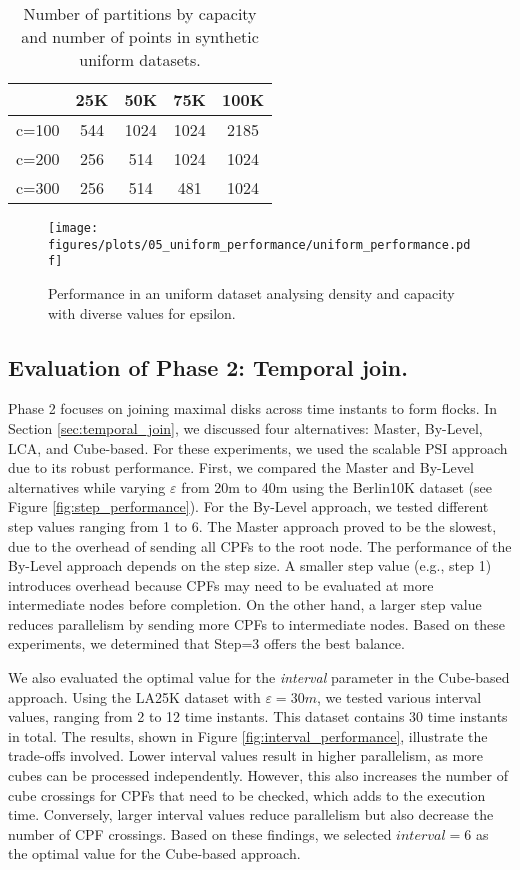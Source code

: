 \begin{table}
    \centering
    \caption{Number of partitions by capacity and number of points in synthetic uniform datasets.}
    \label{tab:uniform_ncells}
    \begin{tabular}{c|cccc}
              & 25K & 50K  & 75K  & 100K \\
        \hline
        c=100 & 544 & 1024 & 1024 & 2185 \\
        c=200 & 256 & 514  & 1024 & 1024 \\
        c=300 & 256 & 514  & 481  & 1024 \\
    \end{tabular}
\end{table}

\begin{figure}
    \centering
    \texttt{[image: figures/plots/05\_uniform\_performance/uniform\_performance.pdf]}
    \caption{Performance in an uniform dataset analysing density and capacity with diverse values for epsilon.}\label{fig:uniform_performance}
\end{figure}

\subsection{Evaluation of Phase 2: Temporal join.}
Phase 2 focuses on joining maximal disks across time instants to form flocks. In Section \ref{sec:temporal_join}, we discussed four alternatives: Master, By-Level, LCA, and Cube-based. For these experiments, we used the scalable PSI approach due to its robust performance.
First, we compared the Master and By-Level alternatives while varying $\varepsilon$ from 20m to 40m using the Berlin10K dataset (see Figure \ref{fig:step_performance}). For the By-Level approach, we tested different step values ranging from 1 to 6. The Master approach proved to be the slowest, due to the overhead of sending all CPFs to the root node. The performance of the By-Level approach depends on the step size. A smaller step value (e.g., step 1) introduces overhead because CPFs may need to be evaluated at more intermediate nodes before completion. On the other hand, a larger step value reduces parallelism by sending more CPFs to intermediate nodes. Based on these experiments, we determined that Step=3 offers the best balance.

We also evaluated the optimal value for the \textit{interval} parameter in the Cube-based approach. Using the LA25K dataset with $\varepsilon=30m$, we tested various interval values, ranging from 2 to 12 time instants. This dataset contains 30 time instants in total. The results, shown in Figure \ref{fig:interval_performance}, illustrate the trade-offs involved. Lower interval values result in higher parallelism, as more cubes can be processed independently. However, this also increases the number of cube crossings for CPFs that need to be checked, which adds to the execution time. Conversely, larger interval values reduce parallelism but also decrease the number of CPF crossings. Based on these findings, we selected $interval=6$ as the optimal value for the Cube-based approach.

